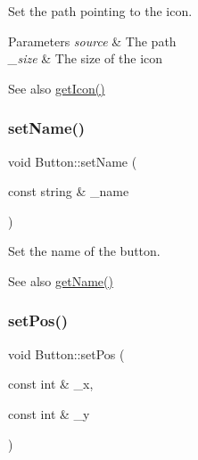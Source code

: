 Set the path pointing to the icon. 


\begin{DoxyParams}{Parameters}
{\em source} & The path \\
\hline
{\em \+\_\+size} & The size of the icon \\
\hline
\end{DoxyParams}
\begin{DoxySeeAlso}{See also}
\mbox{\hyperlink{class_button_a17552602296d94d95e3cc91bce3f4aad}{get\+Icon()}} 
\end{DoxySeeAlso}
\mbox{\label{class_button_ae9ffe01e228623458eedef88ccb42dc6}} 
\subsubsection{\texorpdfstring{set\+Name()}{setName()}}
{\footnotesize\ttfamily void Button\+::set\+Name (\begin{DoxyParamCaption}\item[{const string \&}]{\+\_\+name }\end{DoxyParamCaption})\hspace{0.3cm}{\ttfamily [inline]}}



Set the name of the button. 

\begin{DoxySeeAlso}{See also}
\mbox{\hyperlink{class_button_aebcf5fd7a9807c0f3416546dba5c37bf}{get\+Name()}} 
\end{DoxySeeAlso}
\mbox{\label{class_button_a2a68b92dff42182822d4be189fc3cca6}} 
\subsubsection{\texorpdfstring{set\+Pos()}{setPos()}}
{\footnotesize\ttfamily void Button\+::set\+Pos (\begin{DoxyParamCaption}\item[{const int \&}]{\+\_\+x,  }\item[{const int \&}]{\+\_\+y }\end{DoxyParamCaption})\hspace{0.3cm}{\ttfamily [inline]}}



